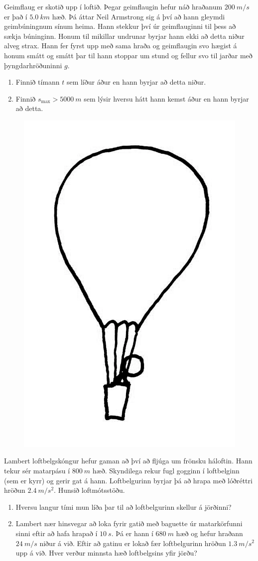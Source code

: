 \ifdefined \wholebook \else\documentclass[oneside]{book}\usepackage{EdlBook}\graphicspath{{figures/}}
\begin{document}
\begin{enumerate}[label = \textbf{Dæmi \thechapter.\arabic*.}]
\item Geimflaug er skotið upp í loftið. Þegar geimflaugin hefur náð hraðanum $\SI{200}{m/s}$ er það í $\SI{5.0}{km}$ hæð. Þá áttar Neil Armstrong sig á því að hann gleymdi geimbúningnum sínum heima. Hann stekkur því úr geimflauginni til þess að sækja búninginn. Honum til mikillar undrunar byrjar hann ekki að detta niður alveg strax. Hann fer fyrst upp með sama hraða og geimflaugin svo hægist á honum smátt og smátt þar til hann stoppar um stund og fellur svo til jarðar með þyngdarhröðuninni $g$.
\begin{enumerate}[label = \textbf{(\alph*)}]
\item Finnið tímann $t$ sem líður áður en hann byrjar að detta niður.
\item Finnið $s_{\text{max}} > \SI{5000}{m}$ sem lýsir hversu hátt hann kemst áður en hann byrjar að detta.
\end{enumerate}

\begin{minipage}{\linewidth}

\begin{figure}

\includegraphics[width=1 in]{images/loftbelgur.png}

\end{figure}

\item
Lambert loftbelgskóngur hefur gaman að því að fljúga um frönsku háloftin. Hann tekur sér matarpásu í $\SI{800}{m}$ hæð. Skyndilega rekur fugl gogginn í loftbelginn (sem er kyrr) og gerir gat á hann. Loftbelgurinn byrjar þá að hrapa með lóðréttri hröðun $\SI{2.4}{m/s^2}$. Hunsið loftmótsstöðu.
\begin{enumerate}[label = \textbf{(\alph*)}]
\item Hversu langur tími mun líða þar til að loftbelgurinn skellur á jörðinni?
\item
Lambert nær hinsvegar að loka fyrir gatið með baguette úr matarkörfunni sinni eftir að hafa hrapað í $\SI{10}{s}$. Þá er hann í $\SI{680}{m}$ hæð og hefur hraðann $\SI{24}{m/s}$ niður á við. Eftir að gatinu er lokað fær loftbelgurinn hröðun $\SI{1.3}{m/s^2}$ upp á við. Hver verður minnsta hæð loftbelgsins yfir jörðu?
\end{enumerate}
\end{minipage}




\end{enumerate}
\end{document}
